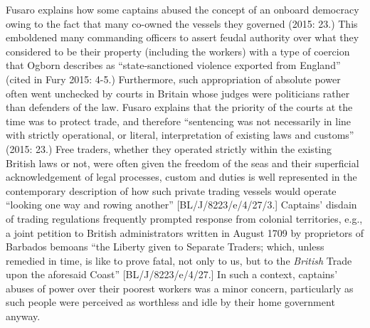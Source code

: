\begin{styleStandard}
Fusaro explains how some captains abused the concept of an onboard democracy owing to the fact that many co-owned the vessels they governed (2015: 23.) This emboldened many commanding officers to assert feudal authority over what they considered to be their property (including the workers) with a type of coercion that Ogborn describes as “state-sanctioned violence exported from England” (cited in Fury 2015: 4-5.) Furthermore, such appropriation of absolute power often went unchecked by courts in Britain whose judges were politicians rather than defenders of the law. Fusaro explains that the priority of the courts at the time was to protect trade, and therefore “sentencing was not necessarily in line with strictly operational, or literal, interpretation of existing laws and customs” (2015: 23.) Free traders, whether they operated strictly within the existing British laws or not, were often given the freedom of the seas and their superficial acknowledgement of legal processes, custom and duties is well represented in the contemporary description of how such private trading vessels would operate “looking one way and rowing another” [BL/J/8223/e/4/27/3.] Captains’ disdain of trading regulations frequently prompted response from colonial territories, e.g., a joint petition to British administrators written in August 1709 by proprietors of Barbados bemoans “the Liberty given to Separate Traders; which, unless remedied in time, is like to prove fatal, not only to us, but to the \textit{British} Trade upon the aforesaid Coast” [BL/J/8223/e/4/27.] In such a context, captains’ abuses of power over their poorest workers was a minor concern, particularly as such people were perceived as worthless and idle by their home government anyway. 
\end{styleStandard}

